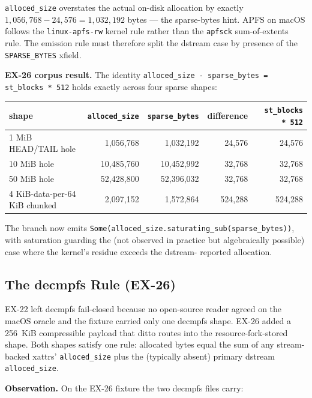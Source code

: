 \texttt{alloced\_size} overstates the actual on-disk allocation by
exactly $1{,}056{,}768 - 24{,}576 = 1{,}032{,}192$ bytes --- the
sparse-bytes hint. APFS on macOS follows the
\texttt{linux-apfs-rw} kernel rule rather than the
\texttt{apfsck} sum-of-extents rule. The emission rule must
therefore split the dstream case by presence of the
\texttt{SPARSE\_BYTES} xfield.

\textbf{EX-26 corpus result.} The identity
\texttt{alloced\_size - sparse\_bytes = st\_blocks * 512} holds
exactly across four sparse shapes:

\begin{center}
\begin{tabular}{lrrrr}
\toprule
shape & \texttt{alloced\_size} & \texttt{sparse\_bytes} & difference & \texttt{st\_blocks * 512} \\
\midrule
1 MiB HEAD/TAIL hole          & 1{,}056{,}768  & 1{,}032{,}192  &    24{,}576 &    24{,}576 \\
10 MiB hole                   & 10{,}485{,}760 & 10{,}452{,}992 &    32{,}768 &    32{,}768 \\
50 MiB hole                   & 52{,}428{,}800 & 52{,}396{,}032 &    32{,}768 &    32{,}768 \\
4 KiB-data-per-64 KiB chunked & 2{,}097{,}152  & 1{,}572{,}864  &   524{,}288 &   524{,}288 \\
\bottomrule
\end{tabular}
\end{center}

The branch now emits
\texttt{Some(alloced\_size.saturating\_sub(sparse\_bytes))}, with
saturation guarding the (not observed in practice but algebraically
possible) case where the kernel's residue exceeds the dstream-
reported allocation.

\subsection{The decmpfs Rule (EX-26)}
\label{ssec:decmpfs-lift}

EX-22 left decmpfs fail-closed because no open-source reader
agreed on the macOS oracle and the fixture carried only one
decmpfs shape. EX-26 added a 256~KiB compressible payload that
ditto routes into the resource-fork-stored shape. Both shapes
satisfy one rule: allocated bytes equal the sum of any
stream-backed xattrs' \texttt{alloced\_size} plus the (typically
absent) primary dstream \texttt{alloced\_size}.

\textbf{Observation.} On the EX-26 fixture the two decmpfs files
carry:

